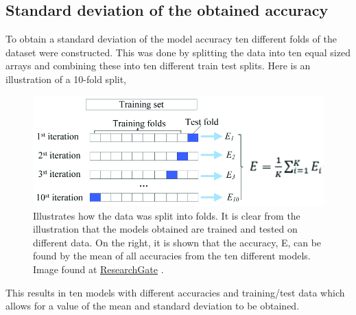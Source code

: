 \documentclass[11pt, fleqn, titlepage]{article}
\begin{document}
	\subsection{Standard deviation of the obtained accuracy} \label{standard_deviation}
	To obtain a standard deviation of the model accuracy ten different folds of the dataset were constructed. This was done by splitting the data into ten equal sized arrays and combining these into ten different train test splits. Here is an illustration of a 10-fold split, 
	
	\begin{figure}[H]
		\centering
		\includegraphics[width=0.8\linewidth]{imgs/kfolds2}
		\caption{Illustrates how the data was split into folds. It is clear from the illustration that the models obtained are trained and tested on different data. On the right, it is shown that the accuracy, E, can be found by the mean of all accuracies from the ten different models. Image found at \href{https://www.researchgate.net/figure/Diagram-of-k-fold-cross-validation-with-k-10-Image-from-Karl-Rosaen-Log_fig1_332370436}{ResearchGate} \cite{researchgate}. }
		\label{fig:kfolds}
	\end{figure}
	
	\noindent
	This results in ten models with different accuracies and training/test data which allows for a value of the mean and standard deviation to be obtained.
	
\end{document}
